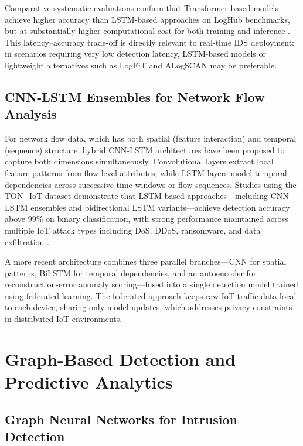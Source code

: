 \documentclass[12pt,a4paper]{report}
\begin{document}
Comparative systematic evaluations confirm that Transformer-based models achieve higher accuracy than LSTM-based approaches on LogHub benchmarks, but at substantially higher computational cost for both training and inference \citep{guo2021,le2023}. This latency--accuracy trade-off is directly relevant to real-time IDS deployment: in scenarios requiring very low detection latency, LSTM-based models or lightweight alternatives such as LogFiT \citep{qi2023} and ALogSCAN \citep{raeiszadeh2025} may be preferable.

\subsection{CNN-LSTM Ensembles for Network Flow Analysis}
\label{sec:cnnlstm-lit}

For network flow data, which has both spatial (feature interaction) and temporal (sequence) structure, hybrid CNN-LSTM architectures have been proposed to capture both dimensions simultaneously. Convolutional layers extract local feature patterns from flow-level attributes, while LSTM layers model temporal dependencies across successive time windows or flow sequences. Studies using the TON\_IoT dataset demonstrate that LSTM-based approaches---including CNN-LSTM ensembles and bidirectional LSTM variants---achieve detection accuracy above 99\% on binary classification, with strong performance maintained across multiple IoT attack types including DoS, DDoS, ransomware, and data exfiltration \citep{ferrag2022,imrana2021}.

A more recent architecture \citep{popoola2021} combines three parallel branches---CNN for spatial patterns, BiLSTM for temporal dependencies, and an autoencoder for reconstruction-error anomaly scoring---fused into a single detection model trained using federated learning. The federated approach keeps raw IoT traffic data local to each device, sharing only model updates, which addresses privacy constraints in distributed IoT environments.

\section{Graph-Based Detection and Predictive Analytics}
\label{sec:graphbased}

\subsection{Graph Neural Networks for Intrusion Detection}
\label{sec:gnn-lit}
\end{document}
